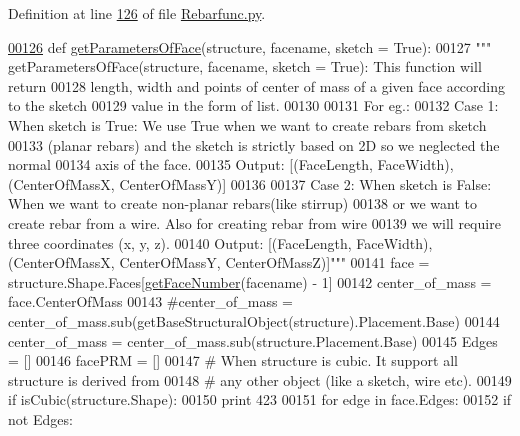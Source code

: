 Definition at line \hyperlink{Rebarfunc_8py_source_l00126}{126} of file \hyperlink{Rebarfunc_8py_source}{Rebarfunc.\+py}.


\begin{DoxyCode}
\hypertarget{namespaceRebarfunc.tex_l00126}{}\hyperlink{namespaceRebarfunc_a92122b3d7cedd3d47bb63380a5ac4d08}{00126} \textcolor{keyword}{def }\hyperlink{namespaceRebarfunc_a92122b3d7cedd3d47bb63380a5ac4d08}{getParametersOfFace}(structure, facename, sketch = True):
00127     \textcolor{stringliteral}{""" getParametersOfFace(structure, facename, sketch = True): This function will return}
00128 \textcolor{stringliteral}{    length, width and points of center of mass of a given face according to the sketch}
00129 \textcolor{stringliteral}{    value in the form of list.}
00130 \textcolor{stringliteral}{}
00131 \textcolor{stringliteral}{    For eg.:}
00132 \textcolor{stringliteral}{    Case 1: When sketch is True: We use True when we want to create rebars from sketch}
00133 \textcolor{stringliteral}{        (planar rebars) and the sketch is strictly based on 2D so we neglected the normal}
00134 \textcolor{stringliteral}{        axis of the face.}
00135 \textcolor{stringliteral}{        Output: [(FaceLength, FaceWidth), (CenterOfMassX, CenterOfMassY)]}
00136 \textcolor{stringliteral}{}
00137 \textcolor{stringliteral}{    Case 2: When sketch is False: When we want to create non-planar rebars(like stirrup)}
00138 \textcolor{stringliteral}{        or we want to create rebar from a wire. Also for creating rebar from wire}
00139 \textcolor{stringliteral}{        we will require three coordinates (x, y, z).}
00140 \textcolor{stringliteral}{        Output: [(FaceLength, FaceWidth), (CenterOfMassX, CenterOfMassY, CenterOfMassZ)]"""}
00141     face = structure.Shape.Faces[\hyperlink{namespaceRebarfunc_a3885b3b63e3a41508ac79bc7550cf301}{getFaceNumber}(facename) - 1]
00142     center\_of\_mass = face.CenterOfMass
00143     \textcolor{comment}{#center\_of\_mass = center\_of\_mass.sub(getBaseStructuralObject(structure).Placement.Base)}
00144     center\_of\_mass = center\_of\_mass.sub(structure.Placement.Base)
00145     Edges = []
00146     facePRM = []
00147     \textcolor{comment}{# When structure is cubic. It support all structure is derived from}
00148     \textcolor{comment}{# any other object (like a sketch, wire etc).}
00149     \textcolor{keywordflow}{if} isCubic(structure.Shape):
00150         \textcolor{keywordflow}{print} 423
00151         \textcolor{keywordflow}{for} edge \textcolor{keywordflow}{in} face.Edges:
00152             \textcolor{keywordflow}{if} \textcolor{keywordflow}{not} Edges:

\end{DoxyCode}
